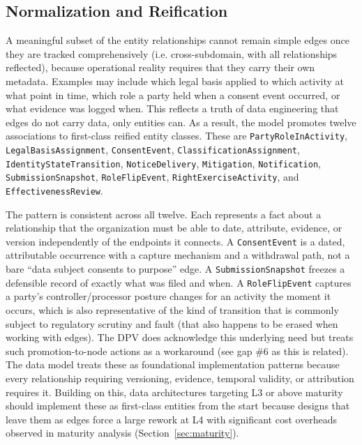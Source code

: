 \documentclass[10pt,letterpaper,twocolumn,twoside]{rho-class/rho}
\begin{document}
\subsection{Normalization and Reification}\label{sec:reify}

A meaningful subset of the entity relationships cannot remain simple edges once they are tracked comprehensively (i.e. cross-subdomain, with all relationships reflected), because operational reality requires that they carry their own metadata. Examples may include which legal basis applied to which activity at what point in time, which role a party held when a consent event occurred, or what evidence was logged when. This reflects a truth of data engineering that edges do not carry data, only entities can. As a result, the model promotes twelve associations to first-class reified entity classes. These are \texttt{PartyRoleInActivity}, \texttt{LegalBasisAssignment}, \texttt{ConsentEvent}, \texttt{ClassificationAssignment}, \texttt{IdentityStateTransition}, \texttt{NoticeDelivery}, \texttt{Mitigation}, \texttt{Notification}, \texttt{SubmissionSnapshot}, \texttt{RoleFlipEvent}, \texttt{RightExerciseActivity}, and \texttt{EffectivenessReview}.

The pattern is consistent across all twelve. Each represents a fact about a relationship that the organization must be able to date, attribute, evidence, or version independently of the endpoints it connects. A \texttt{ConsentEvent} is a dated, attributable occurrence with a capture mechanism and a withdrawal path, not a bare ``data subject consents to purpose'' edge. A \texttt{SubmissionSnapshot} freezes a defensible record of exactly what was filed and when. A \texttt{RoleFlipEvent} captures a party's controller/processor posture changes for an activity the moment it occurs, which is also representative of the kind of transition that is commonly subject to regulatory scrutiny and fault (that also happens to be erased when working with edges). The DPV does acknowledge this underlying need but treats such promotion-to-node actions as a workaround (see gap \#6 as this is related). The data model treats these as foundational implementation patterns because every relationship requiring versioning, evidence, temporal validity, or attribution requires it. Building on this, data architectures targeting L3 or above maturity should implement these as first-class entities from the start because designs that leave them as edges force a large rework at L4 with significant cost overheads observed in maturity analysis (Section~\ref{sec:maturity}).
\end{document}
